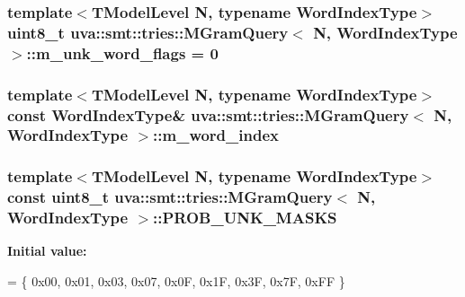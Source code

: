 \subsubsection[{m\+\_\+unk\+\_\+word\+\_\+flags}]{\setlength{\rightskip}{0pt plus 5cm}template$<$T\+Model\+Level N, typename Word\+Index\+Type$>$ uint8\+\_\+t {\bf uva\+::smt\+::tries\+::\+M\+Gram\+Query}$<$ N, Word\+Index\+Type $>$\+::m\+\_\+unk\+\_\+word\+\_\+flags = 0}\label{structuva_1_1smt_1_1tries_1_1_m_gram_query_a17a3df5da9053f4707cbe9ce9022a3a9}
\hypertarget{structuva_1_1smt_1_1tries_1_1_m_gram_query_a71bbc83cb8c6487b7bed52bf10aa1014}{}
\subsubsection[{m\+\_\+word\+\_\+index}]{\setlength{\rightskip}{0pt plus 5cm}template$<$T\+Model\+Level N, typename Word\+Index\+Type$>$ const Word\+Index\+Type\& {\bf uva\+::smt\+::tries\+::\+M\+Gram\+Query}$<$ N, Word\+Index\+Type $>$\+::m\+\_\+word\+\_\+index}\label{structuva_1_1smt_1_1tries_1_1_m_gram_query_a71bbc83cb8c6487b7bed52bf10aa1014}
\hypertarget{structuva_1_1smt_1_1tries_1_1_m_gram_query_abf8a827fe84d185152b2b9330228be5b}{}
\subsubsection[{P\+R\+O\+B\+\_\+\+U\+N\+K\+\_\+\+M\+A\+S\+K\+S}]{\setlength{\rightskip}{0pt plus 5cm}template$<$T\+Model\+Level N, typename Word\+Index\+Type$>$ const uint8\+\_\+t {\bf uva\+::smt\+::tries\+::\+M\+Gram\+Query}$<$ N, Word\+Index\+Type $>$\+::P\+R\+O\+B\+\_\+\+U\+N\+K\+\_\+\+M\+A\+S\+K\+S\hspace{0.3cm}{\ttfamily [static]}}\label{structuva_1_1smt_1_1tries_1_1_m_gram_query_abf8a827fe84d185152b2b9330228be5b}
{\bfseries Initial value\+:}
\begin{DoxyCode}
= \{
                0x00, 0x01, 0x03, 0x07, 0x0F, 0x1F, 0x3F, 0x7F, 0xFF
            \}
\end{DoxyCode}
\hypertarget{structuva_1_1smt_1_1tries_1_1_m_gram_query_af99d0de8ec2e4087a38a7a6b58b1f298}{}
